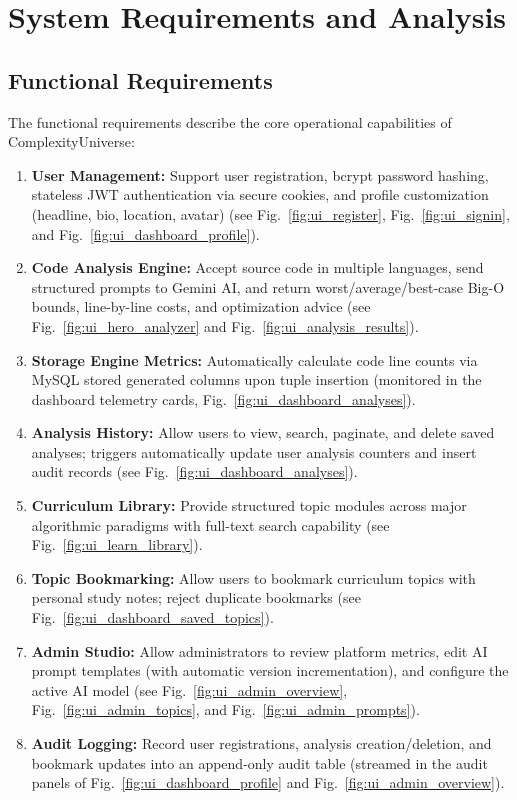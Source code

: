 \documentclass[12pt,a4paper]{report}
\DeclareRobustCommand{\_}{\textunderscore\allowbreak}
\begin{document}
\chapter{System Requirements and Analysis}

\section{Functional Requirements}
The functional requirements describe the core operational capabilities of ComplexityUniverse:

\begin{enumerate}[label=\textbf{FR-\arabic*.}]
    \item \textbf{User Management:} Support user registration, bcrypt password hashing, stateless JWT authentication via secure cookies, and profile customization (headline, bio, location, avatar) (see Fig.~\ref{fig:ui_register}, Fig.~\ref{fig:ui_signin}, and Fig.~\ref{fig:ui_dashboard_profile}).
    \item \textbf{Code Analysis Engine:} Accept source code in multiple languages, send structured prompts to Gemini AI, and return worst/average/best-case Big-O bounds, line-by-line costs, and optimization advice (see Fig.~\ref{fig:ui_hero_analyzer} and Fig.~\ref{fig:ui_analysis_results}).
    \item \textbf{Storage Engine Metrics:} Automatically calculate code line counts via MySQL stored generated columns upon tuple insertion (monitored in the dashboard telemetry cards, Fig.~\ref{fig:ui_dashboard_analyses}).
    \item \textbf{Analysis History:} Allow users to view, search, paginate, and delete saved analyses; triggers automatically update user analysis counters and insert audit records (see Fig.~\ref{fig:ui_dashboard_analyses}).
    \item \textbf{Curriculum Library:} Provide structured topic modules across major algorithmic paradigms with full-text search capability (see Fig.~\ref{fig:ui_learn_library}).
    \item \textbf{Topic Bookmarking:} Allow users to bookmark curriculum topics with personal study notes; reject duplicate bookmarks (see Fig.~\ref{fig:ui_dashboard_saved_topics}).
    \item \textbf{Admin Studio:} Allow administrators to review platform metrics, edit AI prompt templates (with automatic version incrementation), and configure the active AI model (see Fig.~\ref{fig:ui_admin_overview}, Fig.~\ref{fig:ui_admin_topics}, and Fig.~\ref{fig:ui_admin_prompts}).
    \item \textbf{Audit Logging:} Record user registrations, analysis creation/deletion, and bookmark updates into an append-only audit table (streamed in the audit panels of Fig.~\ref{fig:ui_dashboard_profile} and Fig.~\ref{fig:ui_admin_overview}).
\end{enumerate}
\end{document}
